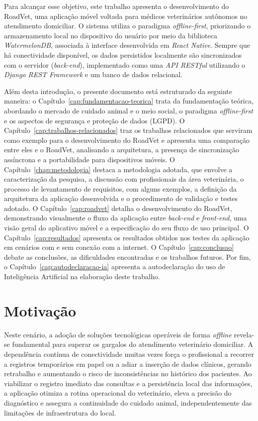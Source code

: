 Para alcançar esse objetivo, este trabalho apresenta o desenvolvimento do RoadVet, uma aplicação móvel voltada para médicos veterinários autônomos no atendimento domiciliar. O sistema utiliza o paradigma \textit{offline-first}, priorizando o armazenamento local no dispositivo do usuário por meio da biblioteca \textit{WatermelonDB}, associada à interface desenvolvida em \textit{React Native}. Sempre que há conectividade disponível, os dados persistidos localmente são sincronizados com o servidor (\textit{back-end}), implementado como uma \textit{API RESTful} utilizando o \textit{Django REST Framework} e um banco de dados relacional.


Além desta introdução, o presente documento está estruturado da seguinte maneira: o Capítulo~\ref{cap:fundamentacao-teorica} trata da fundamentação teórica, abordando o mercado de cuidado animal e o meio social, o paradigma \textit{offline-first} e os aspectos de segurança e proteção de dados (LGPD). O Capítulo~\ref{cap:trabalhos-relacionados} traz os trabalhos relacionados que serviram como exemplo para o desenvolvimento do RoadVet e apresenta uma comparação entre eles e o RoadVet, analisando a arquitetura, a presença de sincronização assíncrona e a portabilidade para dispositivos móveis. O Capítulo~\ref{chap:metodologia} destaca a metodologia adotada, que envolve a caracterização da pesquisa, a discussão com profissionais da área veterinária, o processo de levantamento de requisitos, com alguns exemplos, a definição da arquitetura da aplicação desenvolvida e o procedimento de validação e testes adotado. O Capítulo~\ref{cap:roadvet} detalha o desenvolvimento do RoadVet, demonstrando visualmente o fluxo da aplicação entre \textit{back-end} e \textit{front-end}, uma visão geral do aplicativo móvel e a especificação do seu fluxo de uso principal. O Capítulo~\ref{cap:resultados} apresenta os resultados obtidos nos testes da aplicação em cenários com e sem conexão com a internet. O Capítulo~\ref{cap:conclusao} debate as conclusões, as dificuldades encontradas e os trabalhos futuros. Por fim, o Capítulo~\ref{cap:autodeclaracao-ia} apresenta a autodeclaração do uso de Inteligência Artificial na elaboração deste trabalho.



\section{Motivação}
\label{sec:motivacao}

Neste cenário, a adoção de soluções tecnológicas operáveis de forma \textit{offline} revela-se fundamental para superar os gargalos do atendimento veterinário domiciliar. A dependência contínua de conectividade muitas vezes força o profissional a recorrer a registros temporários em papel ou a adiar a inserção de dados clínicos, gerando retrabalho e aumentando o risco de inconsistências no histórico dos pacientes. Ao viabilizar o registro imediato das consultas e a persistência local das informações, a aplicação otimiza a rotina operacional do veterinário, eleva a precisão do diagnóstico e assegura a continuidade do cuidado animal, independentemente das limitações de infraestrutura do local.  

